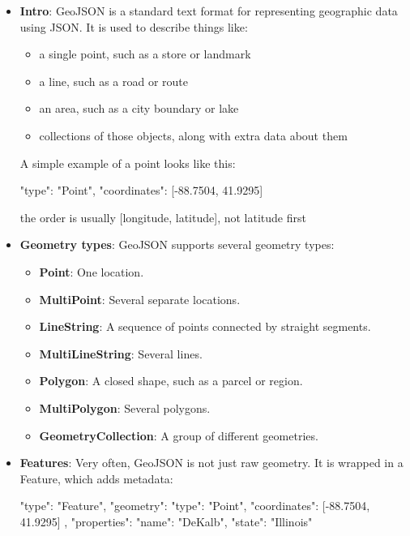 \documentclass{report}
\begin{document}
    \pagebreak 
    \begin{itemize}
        \item \textbf{Intro}: GeoJSON is a standard text format for representing geographic data using JSON.
            \bigbreak \noindent 
            It is used to describe things like:
            \begin{itemize}
                \item a single point, such as a store or landmark
                \item a line, such as a road or route
                \item an area, such as a city boundary or lake
                \item collections of those objects, along with extra data about them
            \end{itemize}
            A simple example of a point looks like this:
            \bigbreak \noindent 
            \begin{jscode}
                {
                    "type": "Point",
                    "coordinates": [-88.7504, 41.9295]
                }
            \end{jscode}
            \bigbreak \noindent 
            the order is usually [longitude, latitude], not latitude first
        \item \textbf{Geometry types}: 
            GeoJSON supports several geometry types:
            \begin{itemize}
                \item \textbf{Point}: One location.
                \item \textbf{MultiPoint}: Several separate locations.
                \item \textbf{LineString}: A sequence of points connected by straight segments.
                \item \textbf{MultiLineString}: Several lines.
                \item \textbf{Polygon}: A closed shape, such as a parcel or region.
                \item \textbf{MultiPolygon}: Several polygons.
                \item \textbf{GeometryCollection}: A group of different geometries.
            \end{itemize}
        \item \textbf{Features}: Very often, GeoJSON is not just raw geometry. It is wrapped in a Feature, which adds metadata:
            \bigbreak \noindent 
            \begin{jscode}
                {
                    "type": "Feature",
                    "geometry": {
                        "type": "Point",
                        "coordinates": [-88.7504, 41.9295]
                    },
                    "properties": {
                        "name": "DeKalb",
                        "state": "Illinois"
                    }
                }
            \end{jscode}
    \end{itemize}





















    
\end{document}
